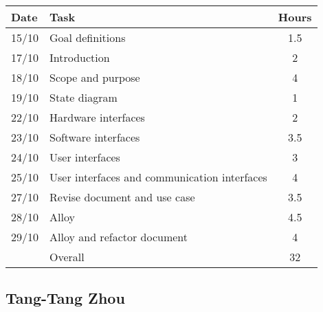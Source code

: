 \begin{table}[H]
\begin{tabularx}{\textwidth}{|l|X|c|}
\hline
\rowcolor[HTML]{C0C0C0} 
Date & Task & Hours\\ \hline
15/10 & Goal definitions & 1.5\\ \hline
17/10 & Introduction & 2\\ \hline
18/10 & Scope and purpose & 4\\ \hline
19/10 & State diagram & 1\\ \hline
22/10 & Hardware interfaces & 2\\ \hline 
23/10 & Software interfaces & 3.5\\ \hline
24/10 & User interfaces & 3\\ \hline
25/10 & User interfaces and communication interfaces & 4\\ \hline 
27/10 & Revise document and use case & 3.5\\ \hline
28/10 & Alloy & 4.5\\ \hline
29/10 & Alloy and refactor document & 4\\ \hline
\rowcolor[HTML]{C0C0C0} 
& Overall & 32\\ \hline
\end{tabularx}
\end{table}

\subsection{Tang-Tang Zhou}

